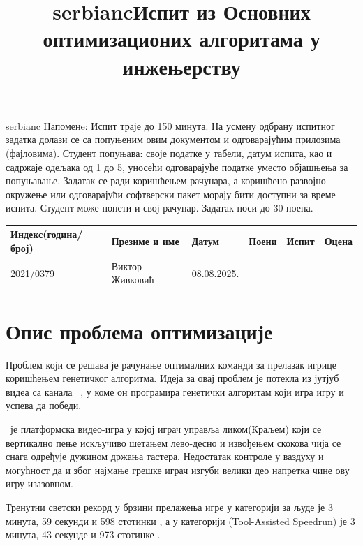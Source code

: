 \documentclass{article}
\title{\begin{otherlanguage*}{serbianc}{Испит из Основних оптимизационих алгоритама у инжењерству}\end{otherlanguage*}}
\date{\vspace{-5ex}}
\newcommand{\jumpking}{\say{Jump King}~}
\begin{document}
\maketitle

\begin{otherlanguage*}{serbianc}
Напоменe: Испит траје до 150 минута. На усмену одбрану испитног задатка долази се са попуњеним овим документом и одговарајућим прилозима (фајловима). Студент попуњава: своје податке у табели, датум испита, као и садржаје одељака од 1 до 5, уносећи одговарајуће податке уместо објашњења за попуњавање. Задатак се ради коришћењем рачунара, а коришћено развојно окружење или одговарајући софтверски пакет морају бити доступни за време испита. Студент може понети и свој рачунар. Задатак носи до 30 поена.

\begin{center}
\begin{tabular}{ | m{2.5cm} | m{6cm}| m{2cm} | m{1.5cm} | m{1.5cm} | m{1.5cm} |}
\hline
Индекс\newline(година/број)& Презиме и име & Датум & Поени & Испит & Оцена\\
\hline
2021/0379 & Виктор Живковић & 08.08.2025. & & & \\[5ex]
\hline
\end{tabular}
\end{center}

\section{Опис проблема оптимизације}

Проблем који се решава је рачунање оптималних команди за прелазак игрице \jumpking
коришћењем генетичког алгоритма.
Идеја за овај проблем је потекла из јутјуб видеа са канала ~\cite{codebulletyt},
у коме он програмира генетички алгоритам који игра игру и успева да победи.

\jumpking је платформска видео-игра у којој играч управља ликом(Краљем) који се
вертикално пење искључиво шетањем лево-десно и извођењем скокова чија се снага одређује дужином
држања тастера.
Недостатак контроле у ваздуху и могућност да и због најмање грешке играч изгуби велики део
напретка чине ову игру изазовном.

Тренутни светски рекорд у брзини прелажења игре у категорији за људе је 3 минута, 59 секунди и
598 стотинки \cite{speedruncom}, а у категорији (Tool-Assisted Speedrun) је
3 минута, 43 секунде и 973 стотинке \cite{tasrecord}.


\end{otherlanguage*}
\end{document}
